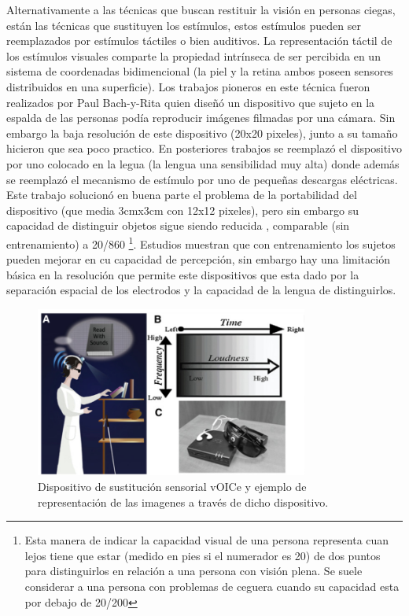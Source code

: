 \documentclass{article}
\begin{document}
    Alternativamente a las técnicas que buscan restituir la visión en personas ciegas, están las técnicas que sustituyen los estímulos, estos estímulos pueden ser reemplazados por estímulos táctiles o bien auditivos. La representación táctil de los estímulos visuales comparte la propiedad intrínseca de ser percibida en un sistema de coordenadas bidimencional (la piel y la retina ambos poseen sensores distribuidos en una superficie). Los trabajos pioneros en este técnica fueron realizados por Paul Bach-y-Rita \cite{Tactil1} quien diseñó un dispositivo que sujeto en la espalda de las personas podía reproducir imágenes filmadas por una cámara. Sin embargo la baja resolución de este dispositivo (20x20 pixeles), junto a su tamaño hicieron que sea poco practico. En posteriores trabajos \cite{Tactil2} se reemplazó el dispositivo por uno colocado en la legua (la lengua una sensibilidad muy alta) donde además se reemplazó el mecanismo de estímulo por uno de pequeñas descargas eléctricas. Este trabajo solucionó en buena parte el problema de la portabilidad del dispositivo (que media 3cmx3cm con 12x12 pixeles), pero sin embargo su capacidad de distinguir objetos sigue siendo reducida \cite{Tactil3}, comparable (sin entrenamiento) a 20/860 \footnote{Esta manera de indicar la capacidad visual de una persona representa cuan lejos tiene que estar (medido en pies si el numerador es 20) de dos puntos para distinguirlos en relación a una persona con visión plena. Se suele considerar a una persona con problemas de ceguera cuando su capacidad esta por debajo de 20/200}. Estudios \cite{Tactil4} muestran que con entrenamiento los sujetos pueden mejorar en cu capacidad de percepción, sin embargo hay una limitación básica en la resolución que permite este dispositivos que esta dado por la separación espacial de los electrodos y la capacidad de la lengua de distinguirlos. 
    
    \begin{figure}
        \center
        \includegraphics[width=0.8\textwidth]{Imagenes/Voice2.png}
        \caption{Dispositivo de sustitución sensorial vOICe y ejemplo de representación de las imagenes a través de dicho dispositivo.}
        \label{fig:Voice2}
    \end{figure}
    
\end{document}

